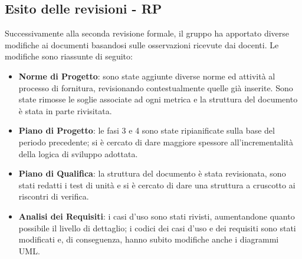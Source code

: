 \subsection{Esito delle revisioni - RP}	
Successivamente alla seconda revisione formale, il gruppo ha apportato diverse modifiche ai documenti basandosi sulle osservazioni ricevute dai docenti. Le modifiche sono riassunte di seguito:
	\begin{itemize}
		\item \textbf{Norme di Progetto}: sono state aggiunte diverse norme ed attività al processo di fornitura, revisionando contestualmente quelle già inserite. Sono state rimosse le soglie associate ad ogni metrica e la struttura del documento è stata in parte rivisitata.
		\item \textbf{Piano di Progetto}: le fasi 3 e 4 sono state ripianificate sulla base del periodo precedente; si è cercato di dare maggiore spessore all'incrementalità della logica di sviluppo adottata. 
		\item \textbf{Piano di Qualifica}: la struttura del documento è stata revisionata, sono stati redatti i test di unità e si è cercato di dare una struttura a cruscotto ai riscontri di verifica.
		\item \textbf{Analisi dei Requisiti}: i casi d'uso sono stati rivisti, aumentandone quanto possibile il livello di dettaglio; i codici dei casi d'uso e dei requisiti sono stati modificati e, di conseguenza, hanno subito modifiche anche i diagrammi UML.
	\end{itemize}

\newpage
